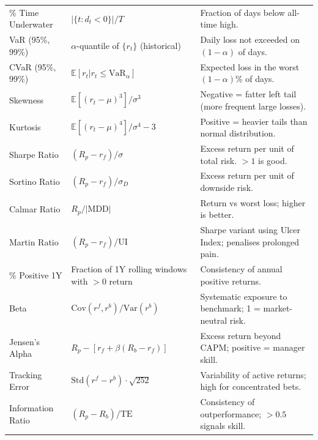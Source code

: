 \documentclass[12pt, a4paper]{article}
\begin{document}
\begin{longtable}{@{}p{3.8cm}p{5cm}p{5.2cm}@{}}
\% Time Underwater
  & $|\{t : d_t < 0\}| / T$
  & Fraction of days below all-time high. \\[4pt]

VaR (95\%, 99\%)
  & $\alpha$-quantile of $\{r_t\}$ (historical)
  & Daily loss not exceeded on $(1-\alpha)$ of days. \\[4pt]

CVaR (95\%, 99\%)
  & $\mathbb{E}[r_t | r_t \leq \mathrm{VaR}_\alpha]$
  & Expected loss in the worst $(1-\alpha)$\% of days. \\[4pt]

Skewness
  & $\mathbb{E}[(r_t-\mu)^3] / \sigma^3$
  & Negative = fatter left tail (more frequent large losses). \\[4pt]

Kurtosis
  & $\mathbb{E}[(r_t-\mu)^4] / \sigma^4 - 3$
  & Positive = heavier tails than normal distribution. \\[4pt]

Sharpe Ratio
  & $(R_p - r_f) / \sigma$
  & Excess return per unit of total risk. $>1$ is good. \\[4pt]

Sortino Ratio
  & $(R_p - r_f) / \sigma_D$
  & Excess return per unit of downside risk. \\[4pt]

Calmar Ratio
  & $R_p / |\mathrm{MDD}|$
  & Return vs worst loss; higher is better. \\[4pt]

Martin Ratio
  & $(R_p - r_f) / \mathrm{UI}$
  & Sharpe variant using Ulcer Index; penalises prolonged pain. \\[4pt]

\% Positive 1Y
  & Fraction of 1Y rolling windows with $>0$ return
  & Consistency of annual positive returns. \\[4pt]

Beta
  & $\mathrm{Cov}(r^f, r^b) / \mathrm{Var}(r^b)$
  & Systematic exposure to benchmark; 1 = market-neutral risk. \\[4pt]

Jensen's Alpha
  & $R_p - [r_f + \beta(R_b - r_f)]$
  & Excess return beyond CAPM; positive = manager skill. \\[4pt]

Tracking Error
  & $\mathrm{Std}(r^f - r^b) \cdot \sqrt{252}$
  & Variability of active returns; high for concentrated bets. \\[4pt]

Information Ratio
  & $(R_p - R_b) / \mathrm{TE}$
  & Consistency of outperformance; $>0.5$ signals skill. \\[4pt]


\end{longtable}
\end{document}
